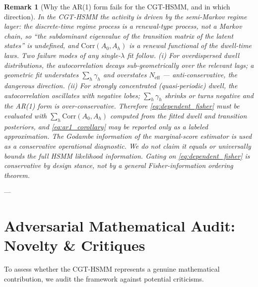 \documentclass[11pt,a4paper]{article}
\newtheorem{remark}{Remark}
\begin{document}
\begin{remark}[Why the AR(1) form fails for the CGT-HSMM, and in which direction]
In the CGT-HSMM the activity is driven by the semi-Markov regime layer: the discrete-time regime process is a renewal-type process, not a Markov chain, so ``the subdominant eigenvalue of the transition matrix of the latent states'' is undefined, and $\mathrm{Corr}(A_0, A_h)$ is a renewal functional of the dwell-time laws. Two failure modes of any single-$\lambda$ fit follow. (i) For \emph{overdispersed} dwell distributions, the autocorrelation decays sub-geometrically over the relevant lags; a geometric fit understates $\sum_h \gamma_h$ and \emph{overstates} $N_{\mathrm{eff}}$ --- anti-conservative, the dangerous direction. (ii) For \emph{strongly concentrated} (quasi-periodic) dwell, the autocorrelation oscillates with negative lobes; $\sum_h \gamma_h$ shrinks or turns negative and the AR(1) form is over-conservative. Therefore \eqref{eq:dependent_fisher} must be evaluated with $\sum_h \mathrm{Corr}(A_0, A_h)$ computed from the fitted dwell and transition posteriors, and \eqref{eq:ar1_corollary} may be reported only as a labeled approximation. The Godambe information of the marginal-score estimator is used as a conservative operational diagnostic. We do not claim it equals or universally bounds the full HSMM likelihood information. Gating on \eqref{eq:dependent_fisher} is conservative by design stance, not by a general Fisher-information ordering theorem. %
\end{remark}

---

\section{Adversarial Mathematical Audit: Novelty \& Critiques}

To assess whether the CGT-HSMM represents a genuine mathematical contribution, we audit the framework against potential criticisms.
\end{document}
